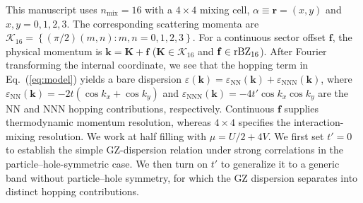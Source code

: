 \documentclass[aps,prl,reprint,superscriptaddress,nofootinbib,longbibliography]{revtex4-1}
\newcommand{\tp}{t'}
\newcommand{\nmix}{n_{\mathrm{mix}}}
\newcommand{\disp}[1]{Eq.~(\ref{#1})}
\begin{document}
This manuscript uses $\nmix=16$ with a $4\times4$ mixing cell, $\alpha\equiv\mathbf r=(x,y)$ and $x,y=0,1,2,3$. The corresponding scattering momenta are
$\mathcal K_{16}=\left\{(\pi/2)(m,n):m,n=0,1,2,3\right\}$. For a continuous sector offset $\mathbf f$, the physical momentum is $\mathbf k=\mathbf K+\mathbf f$ ($\mathbf K\in\mathcal K_{16}$ and $\mathbf f\in{\rm rBZ}_{16}$). %
After Fourier transforming the internal coordinate, we see that the hopping term in \disp{eq:model} yields a bare dispersion $\varepsilon(\mathbf k)=\varepsilon_{\mathrm{NN}}(\mathbf k)+\varepsilon_{\mathrm{NNN}}(\mathbf k)$, where $\varepsilon_{\mathrm{NN}}(\mathbf k)=-2t(\cos k_x+\cos k_y)$ and $\varepsilon_{\mathrm{NNN}}(\mathbf k)=-4\tp\cos k_x\cos k_y$ are the NN and NNN hopping contributions, respectively. Continuous $\mathbf f$ supplies thermodynamic momentum resolution, whereas $4\times4$ specifies the interaction-mixing resolution. We work at half filling with $\mu=U/2+4V$. We first set $\tp=0$ to establish the simple GZ-dispersion relation under strong correlations in the particle--hole-symmetric case. We then turn on $\tp$ to generalize it to a generic band without particle--hole symmetry, for which the GZ dispersion separates into distinct hopping contributions.
\end{document}
